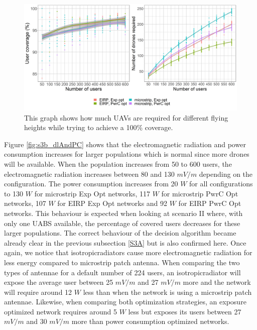 \begin{figure}[h!]
  \includegraphics[width=\textwidth]{../results/s3/uvsnumdronesAndCov.png}
  \caption{This graph shows how much \acs{UAV}s are required for different flying heights while trying to achieve a 100\% coverage.}
  \label{fig:s3b_numdronesAndCov}
\end{figure}


Figure \ref{fig:s3b_dlAndPC} shows that the electromagnetic radiation and power consumption increases for larger 
populations which is normal since more drones will be available.
When the population increases from 50 to 600 users, the electromagnetic radiation increases 
between 80 and 130 $mV/m$ depending on the configuration. The power consumption increases from 
20 $W$ for all configurations to 130 $W$ for microstrip \gls{Exp Opt} networks, 117 $W$ for microstrip \gls{PwrC Opt} networks,
107 $W$ for \gls{EIRP} \gls{Exp Opt} networks and 92 $W$ for \gls{EIRP} \gls{PwrC Opt} networks.
This behaviour is expected  when looking at scenario II where, with only one \gls{UABS} available, 
the percentage of covered users decreases for these larger populations.
The correct behaviour of the decision algorithm became already clear in the previous subsection \ref{S3A} but is also
confirmed here. Once again, we notice that \gls{isotropicradiator}s cause more electromagnetic radiation for less energy
compared to microstrip patch antenna. 
When comparing the two types of antennae for a default number of 224 users, 
an \gls{isotropicradiator} will expose the average user 
between 25 $mV/m$ and 27 $mV/m$ more and the network will require around 12 $W$ less than when the network is using a microstrip patch antennae.
Likewise, when comparing both optimization strategies, an exposure optimized network requires around 5 $W$ less but exposes its users between 27 $mV/m$ and 30 $mV/m$ more than power consumption 
optimized networks. 

